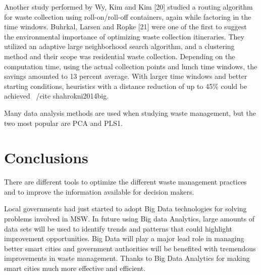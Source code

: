 \documentclass[sigconf]{acmart}
\begin{document}
Another study performed by Wy, Kim and Kim [20] studied a routing algorithm for waste collection using roll-on/roll-off containers, again while factoring in the time windows. Buhrkal, Larsen and Ropke [21] were one of the ﬁrst to suggest the environmental importance of optimizing waste collection itineraries. They utilized an adaptive large neighborhood search algorithm, and a clustering method and their scope was residential waste collection. Depending on the computation time, using the actual collection points and lunch time windows, the savings amounted to 13 percent average. With larger time windows and better starting conditions, heuristics with a distance reduction of up to 45\% could be achieved ~/cite {shahrokni2014big}.



Many data analysis methods are used when studying waste management, but the two most popular are PCA and PLS1. 
~\cite{bohm2013}




\section{Conclusions}


There are different tools to optimize the different waste management practices  and to improve the information available for decision makers.

Local governments had just started to adopt Big Data technologies for solving problems involved in MSW. In future using Big data Analytics, large amounts of data sets will be used to identify trends and patterns that could highlight improvement opportunities. Big Data will play a major lead role in managing better smart cities and government authorities will be benefited with tremendous improvements in waste management. Thanks to Big Data Analytics for making smart cities much more effective and efficient.
\end{document}

